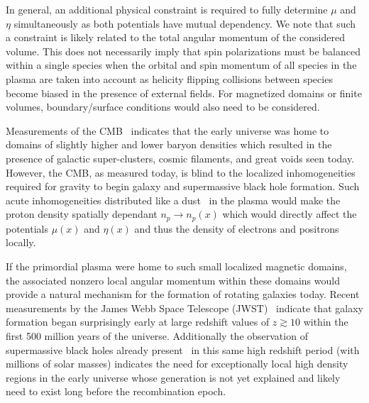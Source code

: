 \documentclass[reprint]{revtex4-2}
\begin{document}
In general, an additional physical constraint is required to fully determine $\mu$ and $\eta$ simultaneously as both potentials have mutual dependency. We note that such a constraint is likely related to the total angular momentum of the considered volume. This does not necessarily imply that spin polarizations must be balanced within a single species when the orbital and spin momentum of all species in the plasma are taken into account as helicity flipping collisions between species become biased in the presence of external fields. For magnetized domains or finite volumes, boundary/surface conditions would also need to be considered.

Measurements of the CMB~\cite{aghanim2018planck} indicates that the early universe was home to domains of slightly higher and lower baryon densities which resulted in the presence of galactic super-clusters, cosmic filaments, and great voids seen today. However, the CMB, as measured today, is blind to the localized inhomogeneities required for gravity to begin galaxy and supermassive black hole formation. Such acute inhomogeneities distributed like a dust~\cite{grayson2023electronpositron} in the plasma would make the proton density spatially dependant $n_{p}\rightarrow n_{p}(x)$ which would directly affect the potentials $\mu(x)$ and $\eta(x)$ and thus the density of electrons and positrons locally.

If the primordial plasma were home to such small localized magnetic domains, the associated nonzero local angular momentum within these domains would provide a natural mechanism for the formation of rotating galaxies today. Recent measurements by the James Webb Space Telescope (JWST)~\cite{yan2022first,adams2023discovery,arrabal2023spectroscopic} indicate that galaxy formation began surprisingly early at large redshift values of $z\gtrsim10$ within the first 500 million years of the universe. Additionally the observation of supermassive black holes already present~\cite{larson2023ceers} in this same high redshift period (with millions of solar masses) indicates the need for exceptionally local high density regions in the early universe whose generation is not yet explained and likely need to exist long before the recombination epoch.

\end{document}
